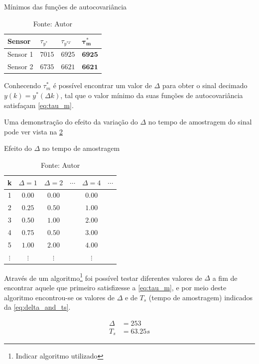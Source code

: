 \begin{apendicesenv}
\begin{table}[h]
	\centering
	\caption{Mínimos das funções de autocovariância}
	\label{tab:tau_s1s2}
	\begin{tabular}{llll} \toprule
		{Sensor}		& {$\tau_{y^{*}}$}		& {$\tau_{y^{*2'}}$}		& {$\pmb{\tau}_{\pmb{m}}^{\pmb{*}}$}		\\ \midrule
		Sensor 1		& $7015$				& $6925$					& $\pmb{6}\pmb{9}\pmb{2}\pmb{5}$			\\
		Sensor 2		& $6735$				& $6621$					& $\pmb{6}\pmb{6}\pmb{2}\pmb{1}$			\\ \bottomrule
	\end{tabular}
	\caption*{Fonte: Autor}
\end{table}

Conhecendo $\tau_{m}^{*}$ é possível encontrar um valor de $\Delta$ para obter o sinal decimado
$y(k) = y^*(\Delta k)$, tal que o valor mínimo da suas funções de autocovariância satisfaçam
\cref{eq:tau_m}.

Uma demonstração do efeito da variação do $\Delta$ no tempo de amostragem do sinal
pode ver vista na \cref{tab:delta_action}

\begin{table}[h]
	\centering
	\caption{Efeito do $\Delta$ no tempo de amostragem}
	\label{tab:delta_action}
	\begin{tabular}{cccccc} \toprule
		{k}			& {$\Delta=1$}		& {$\Delta=2$}		& {$\cdots$}	& {$\Delta=4$}	& {$\cdots$} 	\\ \midrule
		1			& $0.00$			& $0.00$			& \hfill		& $0.00$		& \hfill		\\
		2			& $0.25$			& $0.50$			& \hfill		& $1.00$		& \hfill		\\
		3			& $0.50$			& $1.00$			& \hfill		& $2.00$		& \hfill		\\
		4			& $0.75$			& $0.50$			& \hfill		& $3.00$		& \hfill		\\
		5			& $1.00$			& $2.00$			& \hfill		& $4.00$		& \hfill		\\ 
		$\vdots$	& $\vdots$			& $\vdots$			& \hfill		& $\vdots$		& \hfill		\\ \bottomrule 
	\end{tabular}
	\caption*{Fonte: Autor}
\end{table}

Através de um algoritmo\footnote{
	Indicar algoritmo utilizado			%
} foi possível testar diferentes valores de $\Delta$ a fim de encontrar
aquele que primeiro satisfizesse a \cref{eq:tau_m}, e por meio deste algoritmo encontrou-se
os valores de $\Delta$ e de $T_s$ (tempo de amostragem) indicados da \cref{eq:delta_and_ts}.

\begin{subequations}
    \label{eq:delta_and_ts}
    \begin{align}
		\Delta &= 253	\\
		T_s &= 63.25s
    \end{align}
\end{subequations}


\end{apendicesenv}